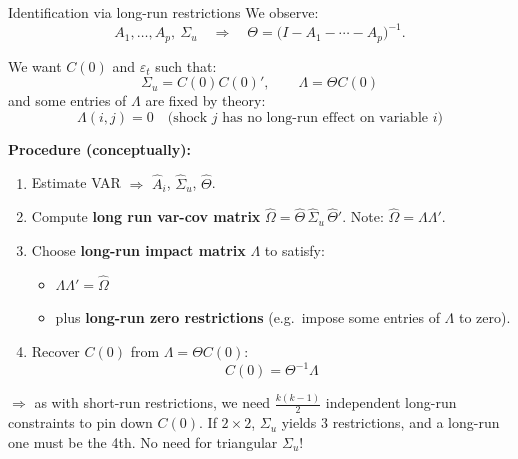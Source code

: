 \documentclass{beamer}
\begin{document}
\begin{frame}{Identification via long-run restrictions}
\scriptsize
We observe:
\[
A_1,\dots,A_p,\ \Sigma_u
\quad\Rightarrow\quad
\Theta = \big(I - A_1 - \cdots - A_p\big)^{-1}.
\]

We want $C(0)$ and $\varepsilon_t$ such that:
\[
\Sigma_u = C(0)C(0)', \qquad \Lambda = \Theta C(0)
\]
and some entries of $\Lambda$ are fixed by theory:
\[
\Lambda(i,j) = 0 \quad \text{(shock $j$ has no long-run effect on variable $i$)}
\]

\medskip
\textbf{Procedure (conceptually):}
\begin{enumerate}
  \item Estimate VAR $\Rightarrow$ $\hat A_i$, $\hat\Sigma_u$, $\hat\Theta$.
  \item Compute \textbf{long run var-cov matrix} $\hat\Omega = \hat\Theta\, \hat\Sigma_u\, \hat\Theta'$.
        Note: $\hat\Omega = \Lambda \Lambda'$.
  \item Choose \textbf{long-run impact matrix} $\Lambda$ to satisfy:
        \begin{itemize}
\scriptsize
          \item $\Lambda \Lambda' = \hat\Omega$
          \item plus \textbf{long-run zero restrictions} (e.g.\ impose some entries of $\Lambda$ to zero).
        \end{itemize}
  \item Recover $C(0)$ from $\Lambda = \Theta C(0)$:
        \[
        C(0) = \Theta^{-1} \Lambda
        \]
\end{enumerate}

\medskip
$\Rightarrow$ as with short-run restrictions, we need $\frac{k(k-1)}{2}$ independent
long-run constraints to pin down $C(0)$. If $2\times2$, $\Sigma_u$ yields 3 restrictions, and a long-run one must be the 4th. No need for triangular $\Sigma_u$!
\end{frame}
\end{document}
